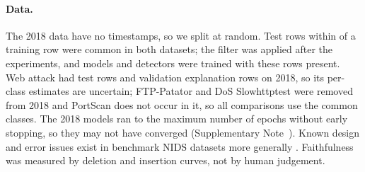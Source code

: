 \paragraph{Data.}
The 2018 data have no timestamps, so we split at random.
Test rows within \paramNDThr{} of a training row were common in both datasets; the filter was applied after the
experiments, and models and detectors were trained with these rows present.
Web attack had \nWebTestEighteen{} test rows and \nWebValEighteen{} validation explanation rows on 2018, so its
per-class estimates are uncertain; FTP-Patator and DoS Slowhttptest were removed from 2018 and PortScan does not occur
in it, so all comparisons use the \nCommonClasses{} common classes.
The 2018 models ran to the maximum number of epochs without early stopping, so they may not have converged
(Supplementary Note~\suppNoteImpl).
Known design and error issues exist in benchmark NIDS datasets more generally \cite{flood2024,lanvin2022}.
Faithfulness was measured by deletion and insertion curves, not by human judgement.
